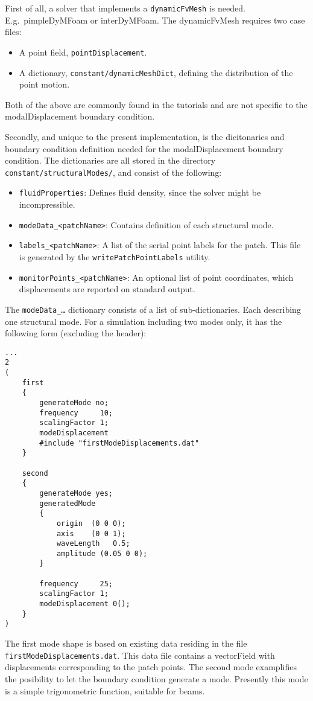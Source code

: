 First of all, a solver that implements a \texttt{dynamicFvMesh} is needed.
E.g.~pimpleDyMFoam or interDyMFoam. The dynamicFvMesh requires two case files:

\begin{itemize}
    \item A point field, \texttt{pointDisplacement}.
    \item A dictionary, \texttt{constant/dynamicMeshDict}, defining the
          distribution of the point motion.
\end{itemize}

Both of the above are commonly found in the tutorials and are not specific to the
modalDisplacement boundary condition.

Secondly, and unique to the present implementation, is the dicitonaries and
boundary condition definition needed for the modalDisplacement boundary
condition. The dictionaries are all stored in the directory
\texttt{constant/structuralModes/}, and consist of the following:

\begin{itemize}
    \item \texttt{fluidProperties}: Defines fluid density, since the solver might be incompressible.
    \item \texttt{modeData\_<patchName>}: Contains definition of each structural mode.
    \item \texttt{labels\_<patchName>}: A list of the serial point labels for the patch. This file is
        generated by the \texttt{writePatchPointLabels} utility.
    \item \texttt{monitorPoints\_<patchName>}: An optional list of point coordinates, which
        displacements are reported on standard output.
\end{itemize}

The \texttt{modeData\_\ldots} dictionary consists of a list of sub-dictionaries. Each describing
one structural mode. For a simulation including two modes only, it has the following form (excluding the header):

\begin{verbatim}
...
2
(
    first
    {
        generateMode no;
        frequency     10;
        scalingFactor 1;
        modeDisplacement
        #include "firstModeDisplacements.dat"
    }

    second
    {
        generateMode yes;
        generatedMode
        {
            origin  (0 0 0);
            axis    (0 0 1);
            waveLength   0.5;
            amplitude (0.05 0 0);
        }

        frequency     25;
        scalingFactor 1;
        modeDisplacement 0();
    }
)
\end{verbatim}

The first mode shape is based on existing data residing in the file \texttt{firstModeDisplacements.dat}.
This data file contains a vectorField with displacements corresponding to the patch points. The second
mode examplifies the posibility to let the boundary condition generate a mode. Presently this mode is
a simple trigonometric function, suitable for beams.

